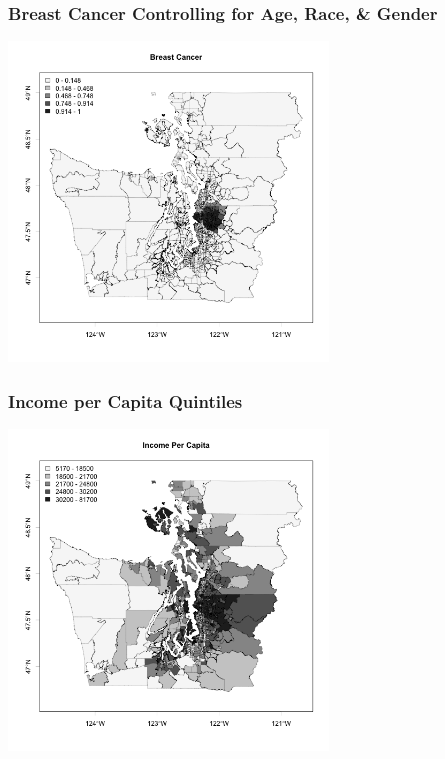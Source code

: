 \documentclass[handout]{beamer}
\begin{document}
\begin{frame}[fragile]
\frametitle{Breast Cancer Controlling for Age, Race, \& Gender}
\begin{center}
\includegraphics[width=8.5cm]{figure/breast.png}
\end{center}
\end{frame}


\begin{frame}[fragile]
\frametitle{Income per Capita Quintiles}
\begin{center}
\includegraphics[width=8.5cm]{figure/income.png}
\end{center}
\end{frame}
\end{document}
